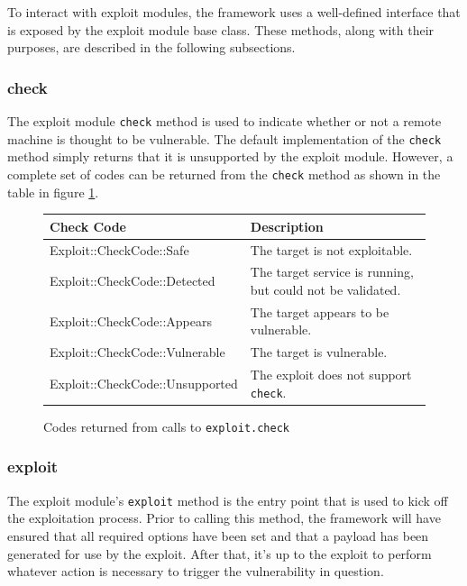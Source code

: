 \documentclass{report}
\begin{document}
\par
To interact with exploit modules, the framework uses a well-defined
interface that is exposed by the exploit module base class.  These
methods, along with their purposes, are described in the following
subsections.

            \subsubsection{check}

\par
The exploit module \texttt{check} method is used to indicate whether
or not a remote machine is thought to be vulnerable.  The default
implementation of the \texttt{check} method simply returns that it
is unsupported by the exploit module.  However, a complete set of
codes can be returned from the \texttt{check} method as shown in the
table in figure \ref{fig-table-exploit-checkcodes}.

\begin{figure}[h]
\begin{center}
\begin{tabular}{|l|p{2.5in}|}
\hline
\textbf{Check Code} & \textbf{Description} \\
\hline
Exploit::CheckCode::Safe & The target is not exploitable. \\
Exploit::CheckCode::Detected & The target service is running, but could not be validated. \\
Exploit::CheckCode::Appears & The target appears to be vulnerable. \\
Exploit::CheckCode::Vulnerable & The target is vulnerable. \\
Exploit::CheckCode::Unsupported & The exploit does not support \texttt{check}. \\
\hline
\end{tabular}
\caption{Codes returned from calls to \texttt{exploit.check}}
\label{fig-table-exploit-checkcodes}
\end{center}
\end{figure}


            \subsubsection{exploit}

\par
The exploit module's \texttt{exploit} method is the entry point that
is used to kick off the exploitation process.  Prior to calling this
method, the framework will have ensured that all required options
have been set and that a payload has been generated for use by the
exploit.  After that, it's up to the exploit to perform whatever
action is necessary to trigger the vulnerability in question.
\end{document}
